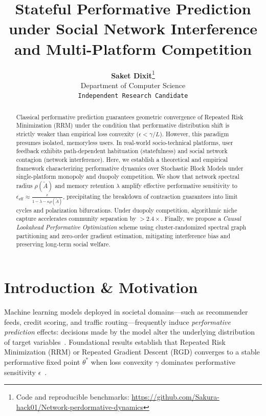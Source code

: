 \documentclass[10pt,twocolumn]{article}
\title{\Large\textbf{Stateful Performative Prediction under Social Network Interference\\and Multi-Platform Competition}}
\author{
  \textbf{Saket Dixit}\thanks{Code and reproducible benchmarks: \url{https://github.com/Sakura-hack01/Network-perdormative-dynamics}} \\
  Department of Computer Science \\
  \texttt{Independent Research Candidate}
}
\date{}
\begin{document}
\maketitle

\begin{abstract}
\small
Classical performative prediction guarantees geometric convergence of Repeated Risk Minimization (RRM) under the condition that performative distribution shift is strictly weaker than empirical loss convexity ($\epsilon < \gamma/L$). However, this paradigm presumes isolated, memoryless users. In real-world socio-technical platforms, user feedback exhibits path-dependent habituation (statefulness) and social network contagion (network interference). Here, we establish a theoretical and empirical framework characterizing performative dynamics over Stochastic Block Models under single-platform monopoly and duopoly competition. We show that network spectral radius $\rho(\tilde{A})$ and memory retention $\lambda$ amplify effective performative sensitivity to $\epsilon_{\text{eff}} \approx \frac{\epsilon}{1 - \lambda - \kappa \rho(\tilde{A})}$, precipitating the breakdown of contraction guarantees into limit cycles and polarization bifurcations. Under duopoly competition, algorithmic niche capture accelerates community separation by $>2.4\times$. Finally, we propose a \emph{Causal Lookahead Performative Optimization} scheme using cluster-randomized spectral graph partitioning and zero-order gradient estimation, mitigating interference bias and preserving long-term social welfare.
\end{abstract}

\section{Introduction \& Motivation}
Machine learning models deployed in societal domains—such as recommender feeds, credit scoring, and traffic routing—frequently induce \emph{performative prediction} effects: decisions made by the model alter the underlying distribution of target variables~\cite{perdomo2020performative, mendler2020stochastic, hardt2022performative}. Foundational results establish that Repeated Risk Minimization (RRM) or Repeated Gradient Descent (RGD) converges to a stable performative fixed point $\theta^*$ when loss convexity $\gamma$ dominates performative sensitivity $\epsilon$~\cite{perdomo2020performative}.
\end{document}
